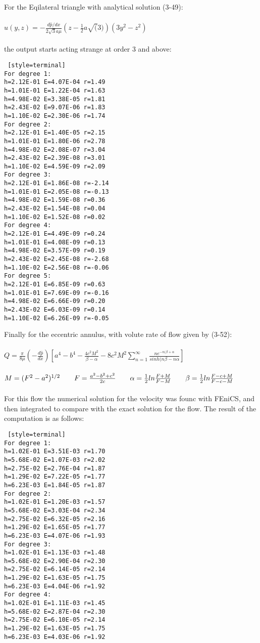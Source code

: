 \documentclass[a4paper,english,11pt,twoside]{article}
\newcommand{\tab}{\hspace*{2em}}
\begin{document}
\newpage
For the Eqilateral triangle with analytical solution (3-49):\\
\\
$u(y,z) = -\frac{d\hat{p}/dx}{2\sqrt{3}a\mu}\left(z - \frac{1}{2}a\sqrt(3)\right)(3y^2 - z^2)$\\
\\
the output starts acting strange at order 3 and above:
\begin{lstlisting} [style=terminal]
For degree 1:
h=2.12E-01 E=4.07E-04 r=1.49
h=1.01E-01 E=1.22E-04 r=1.63
h=4.98E-02 E=3.38E-05 r=1.81
h=2.43E-02 E=9.07E-06 r=1.83
h=1.10E-02 E=2.30E-06 r=1.74
For degree 2:
h=2.12E-01 E=1.40E-05 r=2.15
h=1.01E-01 E=1.80E-06 r=2.78
h=4.98E-02 E=2.08E-07 r=3.04
h=2.43E-02 E=2.39E-08 r=3.01
h=1.10E-02 E=4.59E-09 r=2.09
For degree 3:
h=2.12E-01 E=1.86E-08 r=-2.14
h=1.01E-01 E=2.05E-08 r=-0.13
h=4.98E-02 E=1.59E-08 r=0.36
h=2.43E-02 E=1.54E-08 r=0.04
h=1.10E-02 E=1.52E-08 r=0.02
For degree 4:
h=2.12E-01 E=4.49E-09 r=0.24
h=1.01E-01 E=4.08E-09 r=0.13
h=4.98E-02 E=3.57E-09 r=0.19
h=2.43E-02 E=2.45E-08 r=-2.68
h=1.10E-02 E=2.56E-08 r=-0.06
For degree 5:
h=2.12E-01 E=6.85E-09 r=0.63
h=1.01E-01 E=7.69E-09 r=-0.16
h=4.98E-02 E=6.66E-09 r=0.20
h=2.43E-02 E=6.03E-09 r=0.14
h=1.10E-02 E=6.26E-09 r=-0.05
\end{lstlisting}

\newpage
Finally for the eccentric annulus, with volute rate of flow given by (3-52):\\
\\
$Q = \frac{\pi}{8\mu}\left(-\frac{d\hat{p}}{dx}\right)\left[a^4 - b^4 - \frac{4c^2M^2}{\beta - \alpha} - 8c^2M^2\sum_{n=1}^{\infty}\frac{ne^{-n(\beta+\alpha}}{sinh(n\beta - n\alpha}\right]$\\
\\
$M = (F^2 - a^2)^{1/2}\tab F = \frac{a^2 - b^2 +c^2}{2c}\tab \alpha = \frac{1}{2}ln\frac{F + M}{F - M}\tab \beta = \frac{1}{2}ln\frac{F - c + M}{F - c - M}$\\\
\\
For this flow the numerical solution for the velocity was founc with FEniCS, and then integrated to compare with the exact solution for the flow.  The result of the computation is as follows:
\begin{lstlisting} [style=terminal]
For degree 1:
h=1.02E-01 E=3.51E-03 r=1.70
h=5.68E-02 E=1.07E-03 r=2.02
h=2.75E-02 E=2.76E-04 r=1.87
h=1.29E-02 E=7.22E-05 r=1.77
h=6.23E-03 E=1.84E-05 r=1.87
For degree 2:
h=1.02E-01 E=1.20E-03 r=1.57
h=5.68E-02 E=3.03E-04 r=2.34
h=2.75E-02 E=6.32E-05 r=2.16
h=1.29E-02 E=1.65E-05 r=1.77
h=6.23E-03 E=4.07E-06 r=1.93
For degree 3:
h=1.02E-01 E=1.13E-03 r=1.48
h=5.68E-02 E=2.90E-04 r=2.30
h=2.75E-02 E=6.14E-05 r=2.14
h=1.29E-02 E=1.63E-05 r=1.75
h=6.23E-03 E=4.04E-06 r=1.92
For degree 4:
h=1.02E-01 E=1.11E-03 r=1.45
h=5.68E-02 E=2.87E-04 r=2.30
h=2.75E-02 E=6.10E-05 r=2.14
h=1.29E-02 E=1.63E-05 r=1.75
h=6.23E-03 E=4.03E-06 r=1.92
\end{lstlisting}
\end{document}
